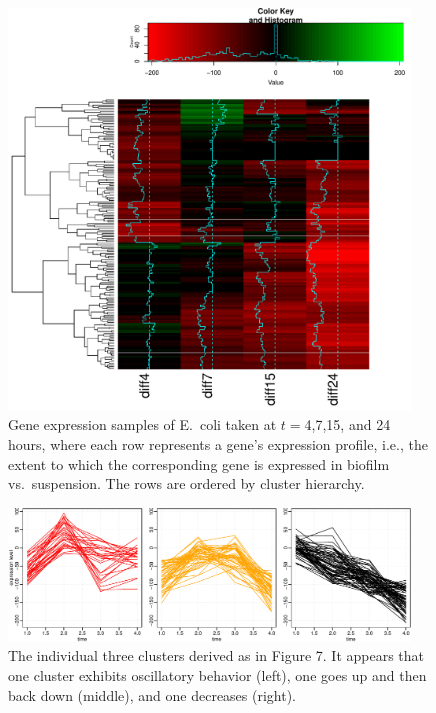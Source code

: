 \begin{figure}[H]
  \centering
    \includegraphics[width=0.95\textwidth]{images/ecoli_heat.pdf}
  \caption{Gene expression samples of E.~coli taken at $t=$4,7,15, and 24 hours, where each row represents a gene's expression profile, i.e., the extent to which the corresponding gene is expressed in biofilm vs.~suspension.  The rows are ordered by cluster hierarchy.}
\end{figure}

\begin{figure}[H]
  \centering
    \includegraphics[width=0.95\textwidth]{images/ecoli_lines.pdf}
  \caption{The individual three clusters derived as in Figure 7.  It appears that one cluster exhibits oscillatory behavior (left), one goes up and then back down (middle), and one decreases (right).}
\end{figure}

